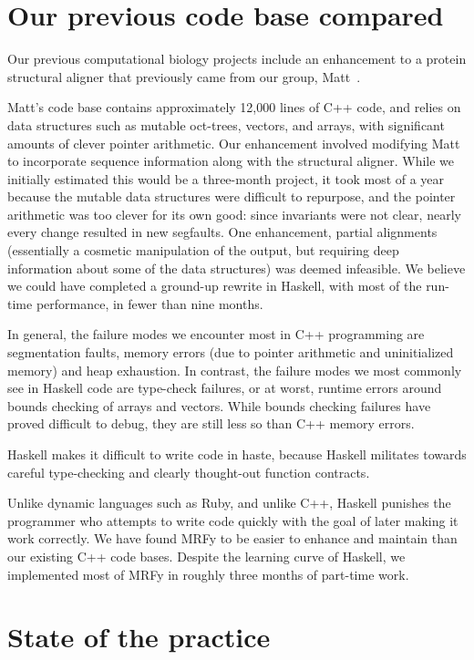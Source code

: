 \documentclass[preprint,nonatbib,blockstyle,nocopyrightspace,times]{sigplanconf}
\let\cite\citep
\begin{document}
 
\section{Our previous code base compared}

Our previous computational biology projects include an enhancement to a protein 
structural aligner that previously came from our group, Matt~\cite{Menke:2008wu}.

Matt's code base contains approximately 12,000 lines of C++ code, and relies on 
data structures such as mutable oct-trees, vectors, and arrays, with 
significant amounts of clever pointer arithmetic.
Our enhancement involved 
modifying Matt to incorporate sequence information along with the structural 
aligner.
While we initially estimated this would be a three-month project, it 
took most of a year because the mutable data structures were difficult to 
repurpose, and the pointer arithmetic was too clever for its own good: since 
invariants were not clear, nearly every change resulted in new segfaults.
One 
enhancement, partial alignments (essentially a cosmetic manipulation of the 
output, but requiring deep information about some of the data structures) was 
deemed infeasible.
We believe we could have completed a ground-up rewrite in 
Haskell, with most of the run-time performance, in fewer than nine months.


In general, the failure modes we encounter most in C++ programming are 
segmentation faults, memory errors (due to pointer arithmetic and uninitialized 
memory) and heap exhaustion.
In contrast, the failure modes we most commonly 
see in Haskell code are type-check failures, or at worst, runtime errors around 
bounds checking of arrays and vectors.
While bounds checking failures have 
proved difficult to debug, they are still less so than C++ memory errors.


Haskell makes it difficult to write code in haste, because Haskell militates 
towards careful type-checking and clearly thought-out function contracts.

Unlike dynamic languages such as Ruby, and unlike C++, Haskell punishes the 
programmer who attempts to write code quickly with the goal of later making it 
work correctly.
We have found MRFy to be easier to enhance and maintain than 
our existing C++ code bases.
Despite the learning curve of Haskell, we 
implemented most of MRFy in roughly three months of part-time work.

 
\section{State of the practice}
\end{document}
